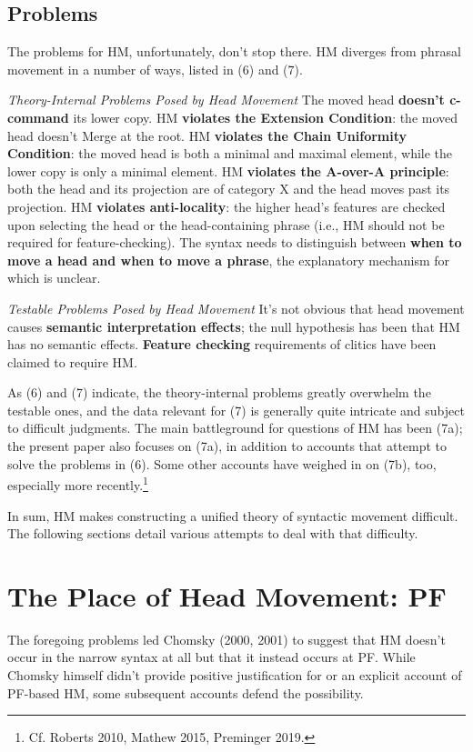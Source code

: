 \documentclass[]{ling-200b-2}
\begin{document}
\subsection{Problems}

The problems for HM, unfortunately, don't stop there. HM diverges from phrasal movement in a number of ways, listed in (6) and (7).

\pex \textit{Theory-Internal Problems Posed by Head Movement}
\a The moved head \textbf{doesn't c-command} its lower copy.
\a HM \textbf{violates the Extension Condition}: the moved head doesn't Merge at the root.
\a HM \textbf{violates the Chain Uniformity Condition}: the moved head is both a minimal and maximal element, while the lower copy is only a minimal element.
\a HM \textbf{violates the A-over-A principle}: both the head and its projection are of category X and the head moves past its projection.
\a HM \textbf{violates anti-locality}: the higher head's features are checked upon selecting the head or the head-containing phrase (i.e., HM should not be required for feature-checking).
\a The syntax needs to distinguish between \textbf{when to move a head and when to move a phrase}, the explanatory mechanism for which is unclear.
\xe
    
\pex \textit{Testable Problems Posed by Head Movement}
\a It's not obvious that head movement causes \textbf{semantic interpretation effects}; the null hypothesis has been that HM has no semantic effects.
\a \textbf{Feature checking} requirements of clitics have been claimed to require HM.
\xe

As (6) and (7) indicate, the theory-internal problems greatly overwhelm the testable ones, and the data relevant for (7) is generally quite intricate and subject to difficult judgments. The main battleground for questions of HM has been (7a); the present paper also focuses on (7a), in addition to accounts that attempt to solve the problems in (6). Some other accounts have weighed in on (7b), too, especially more recently.\footnote{ Cf. Roberts 2010, Mathew 2015, Preminger 2019.}

In sum, HM makes constructing a unified theory of syntactic movement difficult. The following sections detail various attempts to deal with that difficulty.

\section{The Place of Head Movement: PF}

The foregoing problems led Chomsky (2000, 2001) to suggest that HM doesn't occur in the narrow syntax at all but that it instead occurs at PF. While Chomsky himself didn't provide positive justification for or an explicit account of PF-based HM, some subsequent accounts defend the possibility. 
\end{document}
